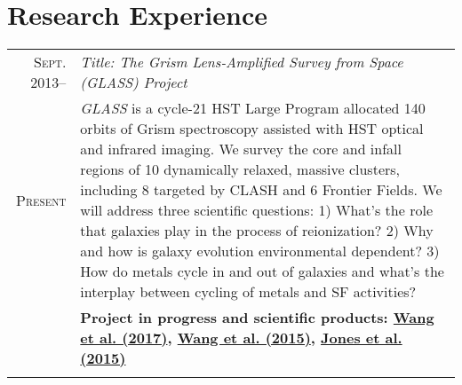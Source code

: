 \documentclass[letterpaper,10pt]{article}
\begin{document}
\section{Research Experience}
\vspace{-1ex}
\begin{longtable}{r|p{5.5in}}
  \textsc{Sept. 2013}--  &   \emph{Title: The Grism Lens-Amplified Survey from Space (GLASS) Project}   \\
  \textsc{Present}       &   \small{\textit{GLASS} is a cycle-21 HST Large Program allocated 140 orbits of Grism spectroscopy
  assisted with HST optical and infrared imaging. We survey the core and infall regions of 10 dynamically relaxed, massive
  clusters, including 8 targeted by CLASH and 6 Frontier Fields. We will address three scientific questions: 1) What's the role that
  galaxies play in the process of reionization? 2) Why and how is galaxy evolution environmental dependent? 3) How do metals cycle
  in and out of galaxies and what's the interplay between cycling of metals and SF activities?}   \\
  & \textbf{Project in progress and scientific products: 
        \hyperlink{17.wang.apj}{Wang et al. (2017)},
        \hyperlink{15.wang.apj}{Wang et al. (2015)},
        \hyperlink{15.jones.aj}{Jones et al. (2015)}} \\
  \multicolumn{2}{c}{} \\

\end{longtable}
\end{document}
